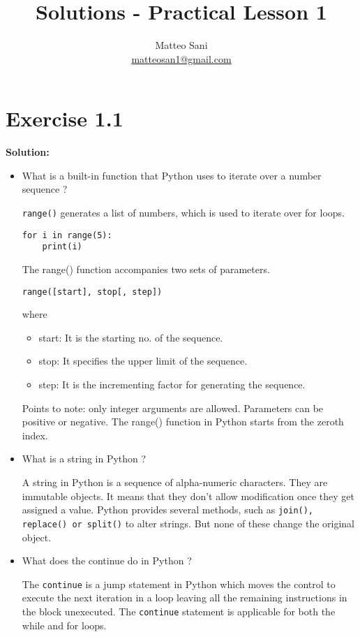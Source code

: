 \documentclass[11pt]{article}
\title{Solutions - Practical Lesson 1}
\author {Matteo Sani \\ \href{mailto:matteosan1@gmail.com}{matteosan1@gmail.com}}
\begin{document}
    
    
    \maketitle

\hypertarget{exercise-1.1}{%
\section{Exercise 1.1}\label{exercise-1.1}}
\textbf{Solution:}
\begin{itemize}
\item What is a built-in function that Python uses to iterate over a number sequence ?
  
\verb;range(); generates a list of numbers, which is used to iterate over for loops.

\begin{verbatim}
for i in range(5):
    print(i)
\end{verbatim}

The range() function accompanies two sets of parameters.

\verb;range([start], stop[, step]);

where
\begin{itemize}
  \item start: It is the starting no. of the sequence.
  \item stop: It specifies the upper limit of the sequence.
  \item step: It is the incrementing factor for generating the sequence.
\end{itemize}

Points to note: only integer arguments are allowed. Parameters can be positive or negative.
The range() function in Python starts from the zeroth index.

\item What is a string in Python ?

  A string in Python is a sequence of alpha-numeric characters. They are immutable objects. It means that they don’t allow modification once they get assigned a value. Python provides several methods, such as \verb;join(), replace() or split(); to alter strings. But none of these change the original object.

\item What does the continue do in Python ?

  The \verb;continue; is a jump statement in Python which moves the control to execute the next iteration in a loop leaving all the remaining instructions in the block unexecuted. The \verb;continue; statement is applicable for both the while and for loops.


\end{itemize}
\end{document}
